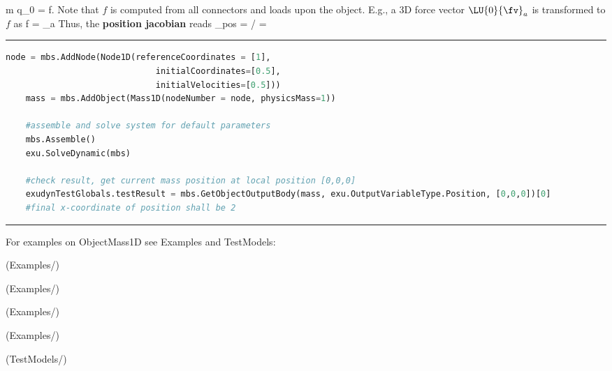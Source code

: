     \be 
      m \cdot \ddot q_0 = f.
    \ee
    Note that $f$ is computed from all connectors and loads upon the object. E.g., a 3D force vector $\LU{0}{\fv}_a$ is 
    transformed to $f$ as
    \be
      f =   _a
    \ee
    Thus, the {\bf position jacobian} reads 
    \be
      \Jm_{pos} = \partial \pv\cCur / \cCur = 
        
    \ee
\vspace{6pt}\par\noindent\rule{\textwidth}{0.4pt}
\label{miniExample_ObjectMass1D}
\pythonstyle
\begin{lstlisting}[language=Python, firstnumber=1]
    node = mbs.AddNode(Node1D(referenceCoordinates = [1], 
                              initialCoordinates=[0.5],
                              initialVelocities=[0.5]))
    mass = mbs.AddObject(Mass1D(nodeNumber = node, physicsMass=1))

    #assemble and solve system for default parameters
    mbs.Assemble()
    exu.SolveDynamic(mbs)

    #check result, get current mass position at local position [0,0,0]
    exudynTestGlobals.testResult = mbs.GetObjectOutputBody(mass, exu.OutputVariableType.Position, [0,0,0])[0]
    #final x-coordinate of position shall be 2

\end{lstlisting}

\vspace{6pt}\par\noindent\rule{\textwidth}{0.4pt}
%
\noindent For examples on ObjectMass1D see Examples and TestModels:
\bi
\item {} (Examples/)
\item {} (Examples/)
\item {} (Examples/)
\item {} (Examples/)
\item {} (TestModels/)
\ei

